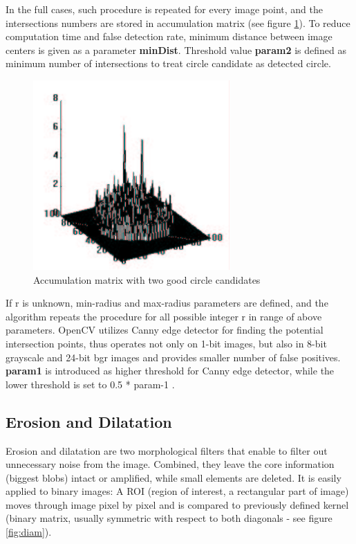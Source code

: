 \documentclass[12pt,twoside,a4paper]{article}
\begin{document}
In the full cases, such procedure is repeated for every image point, and the intersections numbers are stored in accumulation matrix (see figure \ref{fig:accu}).\cite{hgt}
To reduce computation time and false detection rate, minimum distance between image centers is given as a parameter \textbf{minDist}.
Threshold value \textbf{param2} is defined as minimum number of intersections to treat circle candidate as detected circle.
 
\begin{figure}[H]
\centering
\includegraphics[width=0.4\paperwidth]{accu}
\caption{Accumulation matrix with two good circle candidates\cite{hgt}}\label{fig:accu}
\end{figure}

If r is unknown, min-radius and max-radius parameters are defined, and the algorithm repeats the procedure for all possible integer r in range of above parameters.
OpenCV utilizes Canny edge detector for finding the potential intersection points, thus operates not only on 1-bit images, but also in 8-bit grayscale and 24-bit bgr images and provides smaller number of false positives.\cite{mastercv}
\textbf{param1} is introduced as higher threshold for Canny edge detector, while the lower threshold is set to 0.5 * param-1\cite{fd} .


\subsection{Erosion and Dilatation}
Erosion and dilatation are two morphological filters that enable to filter out unnecessary noise from the image.
Combined, they leave the core information (biggest blobs) intact or amplified, while small elements are deleted.
It is easily applied to binary images:
A ROI (region of interest, a rectangular part of image) moves through image pixel by pixel and is compared to previously defined kernel (binary matrix, usually symmetric with respect to both diagonals - see figure \ref{fig:diam}).
\end{document}
